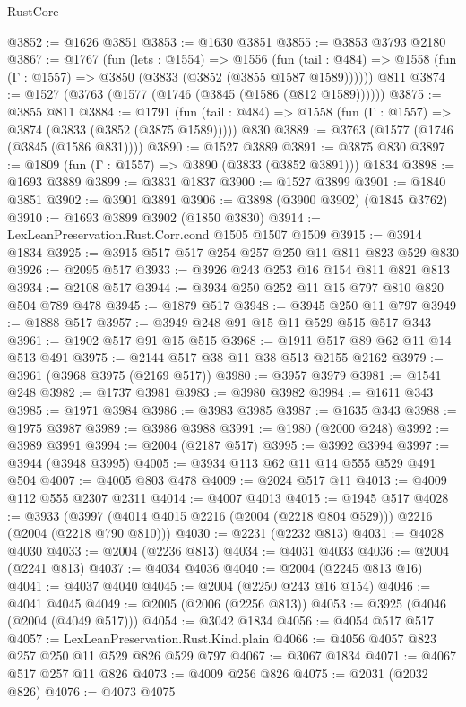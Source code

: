 \begin{lexlean}{RustCore}
\begin{coremodule}
@3852 := @1626 @3851
@3853 := @1630 @3851
@3855 := @3853 @3793 @2180
@3867 := @1767
    (fun (lets : @1554) =>
    @1556
      (fun (tail : @484) => @1558 (fun (Γ : @1557) => @3850 (@3833 (@3852 (@3855 @1587 @1589))))))
    @811
@3874 := @1527 (@3763 (@1577 (@1746 (@3845 (@1586 (@812 @1589))))))
@3875 := @3855 @811
@3884 := @1791
    (fun (tail : @484) => @1558 (fun (Γ : @1557) => @3874 (@3833 (@3852 (@3875 @1589)))))
    @830
@3889 := @3763 (@1577 (@1746 (@3845 (@1586 @831))))
@3890 := @1527 @3889
@3891 := @3875 @830
@3897 := @1809 (fun (Γ : @1557) => @3890 (@3833 (@3852 @3891))) @1834
@3898 := @1693 @3889
@3899 := @3831 @1837
@3900 := @1527 @3899
@3901 := @1840 @3851
@3902 := @3901 @3891
@3906 := @3898 (@3900 @3902) (@1845 @3762)
@3910 := @1693 @3899 @3902 (@1850 @3830)
@3914 := LexLeanPreservation.Rust.Corr.cond @1505 @1507 @1509
@3915 := @3914 @1834
@3925 := @3915 @517 @517 @254 @257 @250 @11 @811 @823 @529 @830
@3926 := @2095 @517
@3933 := @3926 @243 @253 @16 @154 @811 @821 @813
@3934 := @2108 @517
@3944 := @3934 @250 @252 @11 @15 @797 @810 @820 @504 @789 @478
@3945 := @1879 @517
@3948 := @3945 @250 @11 @797
@3949 := @1888 @517
@3957 := @3949 @248 @91 @15 @11 @529 @515 @517 @343
@3961 := @1902 @517 @91 @15 @515
@3968 := @1911 @517 @89 @62 @11 @14 @513 @491
@3975 := @2144 @517 @38 @11 @38 @513 @2155 @2162
@3979 := @3961 (@3968 @3975 (@2169 @517))
@3980 := @3957 @3979
@3981 := @1541 @248
@3982 := @1737 @3981
@3983 := @3980 @3982
@3984 := @1611 @343
@3985 := @1971 @3984
@3986 := @3983 @3985
@3987 := @1635 @343
@3988 := @1975 @3987
@3989 := @3986 @3988
@3991 := @1980 (@2000 @248)
@3992 := @3989 @3991
@3994 := @2004 (@2187 @517)
@3995 := @3992 @3994
@3997 := @3944 (@3948 @3995)
@4005 := @3934 @113 @62 @11 @14 @555 @529 @491 @504
@4007 := @4005 @803 @478
@4009 := @2024 @517 @11
@4013 := @4009 @112 @555 @2307 @2311
@4014 := @4007 @4013
@4015 := @1945 @517
@4028 := @3933 (@3997 (@4014 @4015 @2216 (@2004 (@2218 @804 @529))) @2216 (@2004 (@2218 @790 @810)))
@4030 := @2231 (@2232 @813)
@4031 := @4028 @4030
@4033 := @2004 (@2236 @813)
@4034 := @4031 @4033
@4036 := @2004 (@2241 @813)
@4037 := @4034 @4036
@4040 := @2004 (@2245 @813 @16)
@4041 := @4037 @4040
@4045 := @2004 (@2250 @243 @16 @154)
@4046 := @4041 @4045
@4049 := @2005 (@2006 (@2256 @813))
@4053 := @3925 (@4046 (@2004 (@4049 @517)))
@4054 := @3042 @1834
@4056 := @4054 @517 @517
@4057 := LexLeanPreservation.Rust.Kind.plain
@4066 := @4056 @4057 @823 @257 @250 @11 @529 @826 @529 @797
@4067 := @3067 @1834
@4071 := @4067 @517 @257 @11 @826
@4073 := @4009 @256 @826
@4075 := @2031 (@2032 @826)
@4076 := @4073 @4075

\end{coremodule}
\end{lexlean}
